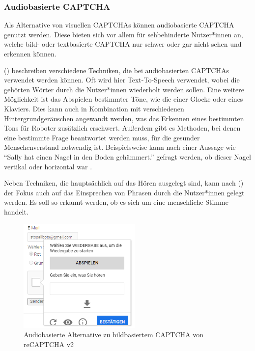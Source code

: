 \subsubsection*{Audiobasierte CAPTCHA}
Als Alternative von visuellen CAPTCHAs können audiobasierte CAPTCHA genutzt werden.
Diese bieten sich vor allem für sehbehinderte Nutzer*innen an, welche bild- oder textbasierte CAPTCHA nur schwer oder gar nicht sehen und erkennen können.

\citeauthor{surveyofresearch} (\cite[p.78]{surveyofresearch}) beschreiben verschiedene Techniken, die bei audiobasierten CAPTCHAs verwendet werden können.
Oft wird hier Text-To-Speech verwendet, wobei die gehörten Wörter durch die Nutzer*innen wiederholt werden sollen.
Eine weitere Möglichkeit ist das Abspielen bestimmter Töne, wie die einer Glocke oder eines Klaviers. 
Dies kann auch in Kombination mit verschiedenen Hintergrundgeräuschen angewandt werden, was das Erkennen eines bestimmten Tons für Roboter zusätzlich erschwert.
Außerdem gibt es Methoden, bei denen eine bestimmte Frage beantwortet werden muss, für die gesunder Menschenverstand notwendig ist. 
Beispielsweise kann nach einer Aussage wie ``Sally hat einen Nagel in den Boden gehämmert.'' gefragt werden, ob dieser Nagel vertikal oder horizontal war \cite[p.3]{commonsense}. 

Neben Techniken, die hauptsächlich auf das Hören ausgelegt sind, kann nach \citeauthor{surveyofresearch} (\cite[p.78]{surveyofresearch}) der Fokus auch auf das Einsprechen von Phrasen durch die Nutzer*innen gelegt werden.
Es soll so erkannt werden, ob es sich um eine menschliche Stimme handelt.


\begin{figure}[h!]
    \centering
    \includegraphics[width=6cm]{gfx/mygraphics/audio.png}
     \caption{Audiobasierte Alternative zu bildbasiertem CAPTCHA von reCAPTCHA v2}
      \label{fig:audio}
\end{figure}

\pagebreak

